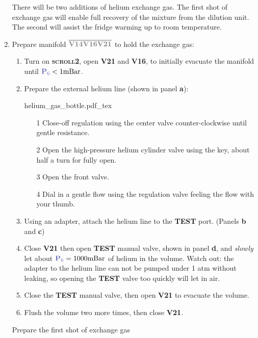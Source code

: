 \documentclass{article}[18pt,A4]
\newcommand{\mBar}{\mathrm{mBar}}
\newcommand{\thing}[1]{{\color{gray}\textsc{ \textbf{#1}}}}
\newcommand{\valve}[1]{{\color{gray}\textbf{V#1}}}
\newcommand{\pressure}[1]{{\color{pressurecolor}\textbf{P}\textsubscript{#1}}}
\newcommand{\volume}[1]{\ensuremath{\overline{#1}}}
\begin{document}
\begin{enumerate}
    
    There will be two additions of helium exchange gas. 
    The first shot of exchange gas will enable full recovery of the mixture from the dilution unit.
    The second will assist the fridge warming up to room temperature.
    
    \item Prepare manifold \volume{\valve{14} \valve{16} \valve{21}} to hold the exchange gas:
        \begin{enumerate}
        \item Turn on \thing{scroll2}, open \valve{21} and \valve{16}, to initially evacuate the manifold until $\pressure{6} < 1 \mBar$. 
        \item Prepare the external helium line (shown in panel \textbf{a}):
        
{
\centering
{helium_gas_bottle.pdf_tex}
}

            \begin{enumerate}
             \item[1] Close-off regulation using the center valve counter-clockwise until gentle resistance. 
             \item[2] Open the high-pressure helium cylinder valve using the key, about half a turn for fully open.
             \item[3] Open the front valve.
             \item[4] Dial in a gentle flow using the regulation valve feeling the flow with your thumb. 
            \end{enumerate}
        \item Using an adapter, attach the helium line to the \thing{TEST} port. (Panels \textbf{b} and \textbf{c})
        \item Close \valve{21} then open \thing{TEST} manual valve, shown in panel \textbf{d},  and \emph{slowly} let about $\pressure{6} = 1000 \mBar$ of helium in the volume.
        Watch out: the adapter to the helium line can not be pumped under 1 atm without leaking, so opening the \thing{TEST} valve too quickly will let in air.
        \item Close the \thing{TEST} manual valve, then open \valve{21} to evacuate the volume.
        \item Flush the volume two more times, then close \valve{21}.
        \end{enumerate}
        
      Prepare the first shot of exchange gas
       

\end{enumerate}
\end{document}
